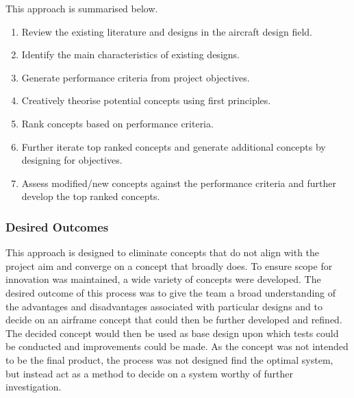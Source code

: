 This approach is summarised below.
\begin{enumerate}
    \item Review the existing literature and designs in the aircraft design field.
    \item Identify the main characteristics of existing designs.
    \item Generate performance criteria from project objectives.
    \item Creatively theorise potential concepts using first principles.
    \item Rank concepts based on performance criteria.
    \item Further iterate top ranked concepts and generate additional concepts by designing for objectives.
    \item Assess modified/new concepts against the performance criteria and further develop the top ranked concepts.
\end{enumerate}

\subsubsection{Desired Outcomes}

This approach is designed to eliminate concepts that do not align with the project aim and converge on a concept that broadly does. To ensure scope for innovation was maintained, a wide variety of concepts were developed. The desired outcome of this process was to give the team a broad understanding of the advantages and disadvantages associated with particular designs and to decide on an airframe concept that could then be further developed and refined. The decided concept would then be used as base design upon which tests could be conducted and improvements could be made. As the concept was not intended to be the final product, the process was not designed find the optimal system, but instead act as a method to decide on a system worthy of further investigation.



